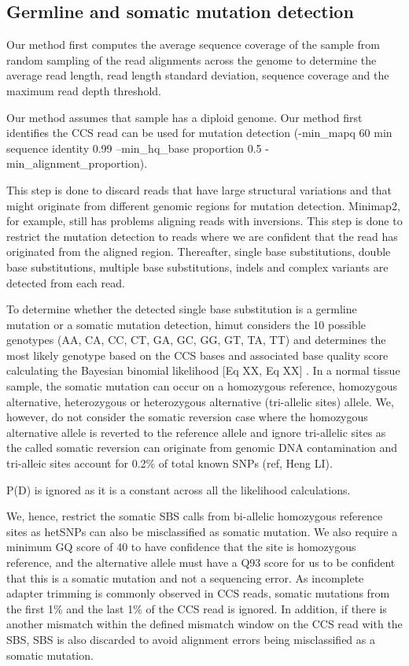 \subsection{Germline and somatic mutation detection}

Our method first computes the average sequence coverage of the sample from random sampling of the read alignments across the genome to determine the average read length, read length standard deviation, sequence coverage and the maximum read depth threshold. 

Our method assumes that sample has a diploid genome. Our method first identifies the CCS read can be used for mutation detection (-min\_mapq 60 min sequence identity 0.99 --min\_hq\_base proportion 0.5 -min\_alignment\_proportion). 

This step is done to discard reads that have large structural variations and that might originate from different genomic regions for mutation detection. Minimap2, for example, still has problems aligning reads with inversions. This step is done to restrict the mutation detection to reads where we are confident that the read has originated from the aligned region. Thereafter, single base substitutions, double base substitutions, multiple base substitutions, indels and complex variants are detected from each read. 

To determine whether the detected single base substitution is a germline mutation or a somatic mutation detection, himut considers the 10 possible genotypes (AA, CA, CC, CT, GA, GC, GG, GT, TA, TT) and determines the most likely genotype based on the CCS bases and associated base quality score calculating the Bayesian binomial likelihood [Eq XX, Eq XX] \cite{Li2011-ag}.  In a normal tissue sample, the somatic mutation can occur on a homozygous reference, homozygous alternative, heterozygous or heterozygous alternative (tri-allelic sites) allele. We, however, do not consider the somatic reversion case where the homozygous alternative allele is reverted to the reference allele and ignore tri-allelic sites as the called somatic reversion can originate from genomic DNA contamination and tri-alleic sites account for 0.2\% of total known SNPs (ref, Heng LI). 

P(D) is ignored as it is a constant across all the likelihood calculations. 

We, hence, restrict the somatic SBS calls from bi-allelic homozygous reference sites as hetSNPs can also be misclassified as somatic mutation. We also require a minimum GQ score of 40 to have confidence that the site is homozygous reference, and the alternative allele must have a Q93 score for us to be confident that this is a somatic mutation and not a sequencing error. As incomplete adapter trimming is commonly observed in CCS reads, somatic mutations from the first 1\% and the last 1\% of the CCS read is ignored. In addition, if there is another mismatch within the defined mismatch window on the CCS read with the SBS, SBS is also discarded to avoid alignment errors being misclassified as a somatic mutation. 

